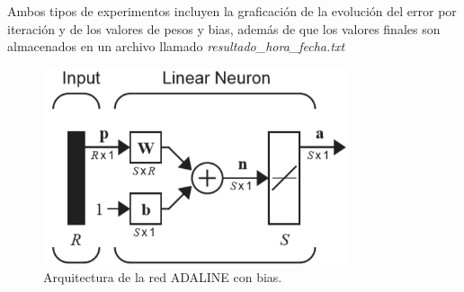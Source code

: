 \documentclass[12pt, titlepage]{article}
\begin{document}
    Ambos tipos de experimentos incluyen la graficación de la evolución del error por iteración y de los valores de pesos y bias, además de que los valores finales son almacenados en un archivo llamado \emph{resultado\_hora\_fecha.txt}
    \begin{figure}[H]
        \begin{center}
            \includegraphics[width=9cm]{img/adaline/arquitectura.png}
            \caption{Arquitectura de la red ADALINE con bias. \cite{libro1}}
            \label{fig:adaline-diagrama2}
        \end{center}
    \end{figure}
\end{document}
